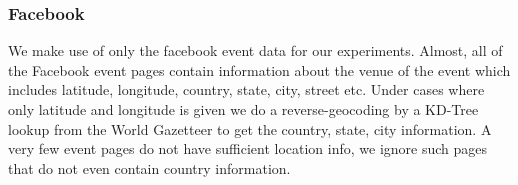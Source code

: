 \subsubsection{Facebook}
We make use of only the facebook event data for our experiments. Almost, all of the Facebook event pages contain information about the venue of the event which includes latitude, longitude, country, state, city, street etc. Under cases where only latitude and longitude is given we do a reverse-geocoding by a KD-Tree lookup\cite{kd-tree} from the World Gazetteer to get the country, state, city information. A very few event pages do not have sufficient location info, we ignore such pages that do not even contain country information.
